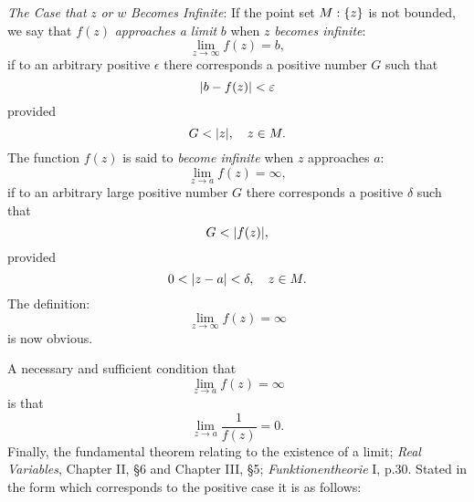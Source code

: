 \documentclass[twosided]{memoir}
\begin{document}
\emph{The Case that} $z$ \emph{or} $w$ \emph{Becomes Infinite}: If the point set $M : \cbr*{z} $ is not bounded, we say that $f(z)$ \emph{approaches a limit} $b$ when $z$ \emph{becomes infinite}:
\[
	\lim\limits_{z \to \infty} f(z)=b
,\] if to an arbitrary positive $\epsilon$ there corresponds a positive number $G$ such that
\[
	\abs*{b-f(z)} <\epsilon
\] provided
\[
G<\abs*{z} , \quad z \in M
.\] The function $f(z)$ is said to \emph{become infinite} when $z$ approaches $a$:
\[
	\lim\limits_{z \to a} f(z)=\infty
,\] if to an arbitrary large positive number $G$ there corresponds a positive $\delta $ such that
\[
	G<\abs*{f(z)} 
,\] provided 
\[
0<\abs*{z-a} <\delta , \quad z \in M
.\] The definition:
\[
	\lim\limits_{z \to \infty} f(z)=\infty
\] is now obvious. 

A necessary and sufficient condition that
\[
	\lim\limits_{z \to a} f(z)=\infty
\] is that
\[
	\lim\limits_{z\to a} \frac{1}{f(z)}=0
.\] Finally, the fundamental theorem relating to the existence of a limit; \emph{Real Variables}, Chapter II, \S 6 and Chapter III, \S 5; \emph{Funktionentheorie} I, p.30. Stated in the form which corresponds to the positive case it is as follows:
\end{document}
